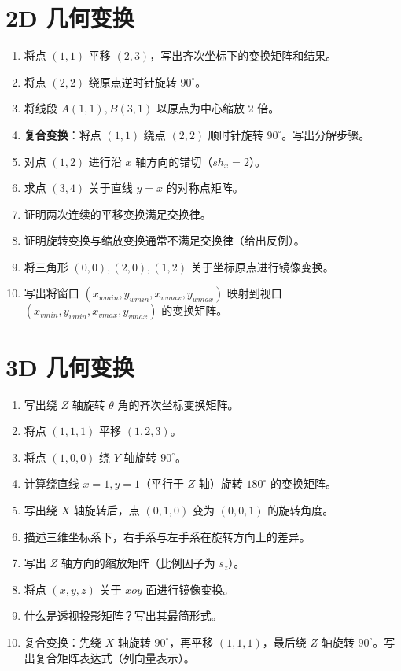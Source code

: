 \documentclass[UTF8]{ctexart}
\begin{document}
\section{2D 几何变换}
\begin{enumerate}
    \item 将点 $(1,1)$ 平移 $(2,3)$，写出齐次坐标下的变换矩阵和结果。
    \item 将点 $(2,2)$ 绕原点逆时针旋转 $90^\circ$。
    \item 将线段 $A(1,1), B(3,1)$ 以原点为中心缩放 2 倍。
    \item \textbf{复合变换}：将点 $(1,1)$ 绕点 $(2,2)$ 顺时针旋转 $90^\circ$。写出分解步骤。
    \item 对点 $(1,2)$ 进行沿 $x$ 轴方向的错切（$sh_x = 2$）。
    \item 求点 $(3,4)$ 关于直线 $y=x$ 的对称点矩阵。
    \item 证明两次连续的平移变换满足交换律。
    \item 证明旋转变换与缩放变换通常不满足交换律（给出反例）。
    \item 将三角形 $(0,0), (2,0), (1,2)$ 关于坐标原点进行镜像变换。
    \item 写出将窗口 $(x_{wmin}, y_{wmin}, x_{wmax}, y_{wmax})$ 映射到视口 $(x_{vmin}, y_{vmin}, x_{vmax}, y_{vmax})$ 的变换矩阵。
\end{enumerate}

\section{3D 几何变换}
\begin{enumerate}
    \item 写出绕 $Z$ 轴旋转 $\theta$ 角的齐次坐标变换矩阵。
    \item 将点 $(1,1,1)$ 平移 $(1,2,3)$。
    \item 将点 $(1,0,0)$ 绕 $Y$ 轴旋转 $90^\circ$。
    \item 计算绕直线 $x=1, y=1$（平行于 $Z$ 轴）旋转 $180^\circ$ 的变换矩阵。
    \item 写出绕 $X$ 轴旋转后，点 $(0,1,0)$ 变为 $(0,0,1)$ 的旋转角度。
    \item 描述三维坐标系下，右手系与左手系在旋转方向上的差异。
    \item 写出 $Z$ 轴方向的缩放矩阵（比例因子为 $s_z$）。
    \item 将点 $(x,y,z)$ 关于 $xoy$ 面进行镜像变换。
    \item 什么是透视投影矩阵？写出其最简形式。
    \item 复合变换：先绕 $X$ 轴旋转 $90^\circ$，再平移 $(1,1,1)$，最后绕 $Z$ 轴旋转 $90^\circ$。写出复合矩阵表达式（列向量表示）。
\end{enumerate}
\end{document}
